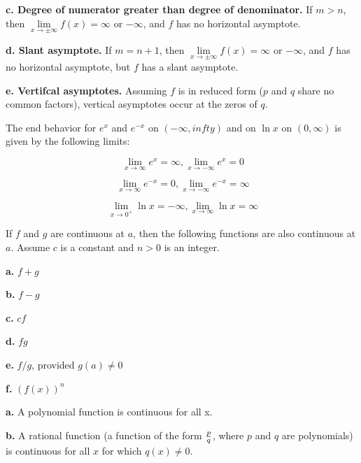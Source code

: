 \par {\bf c. Degree of numerator greater than degree of denominator.}
If $m > n$, then $\lim\limits_{x \to \pm\infty} f(x) = \infty$ or $-\infty$,
and $f$ has no horizontal asymptote.

\par {\bf d. Slant asymptote.}
If $m = n + 1$, then $\lim\limits_{x \to \pm\infty} f(x) = \infty$
or $-\infty$, and $f$ has no horizontal asymptote, but $f$
has a slant asymptote.

\par {\bf e. Vertifcal asymptotes.} Assuming $f$ is in
reduced form ($p$ and $q$ share no common factors), vertical
asymptotes occur at the zeros of $q$.
\endthm

The end behavior for $e^x$ and $e^{-x}$ on $(-\infty, infty)$
and on $\ln x$ on $(0, \infty)$ is given by the following
limits:

$$\
\lim_{x \to \infty} e^x = \infty,
\lim_{x \to -\infty} e^x = 0
$$

$$\
\lim_{x \to \infty} e^{-x} = 0,
\lim_{x \to -\infty} e^{-x} = \infty
$$

$$\
\lim_{x \to 0^+} \ln x = -\infty,
\lim_{x \to \infty} \ln x = \infty
$$
\endthm

If $f$ and $g$ are continuous at $a$, then the following
functions are also continuous at $a$. Assume $c$ is a constant
and $n > 0$ is an integer.

\par {\bf a.} $f + g$

\par {\bf b.} $f - g$

\par {\bf c.} $cf$

\par {\bf d.} $fg$

\par {\bf e.} $f/g$, provided $g(a) \ne 0$

\par {\bf f.} $(f(x))^n$

\endthm

\par {\bf a.} A polynomial function is continuous for all x.

\par {\bf b.} A rational function (a function of the form
${p \over q}$, where $p$ and $q$ are polynomials)
is continuous for all $x$ for which $q(x) \ne 0$.

